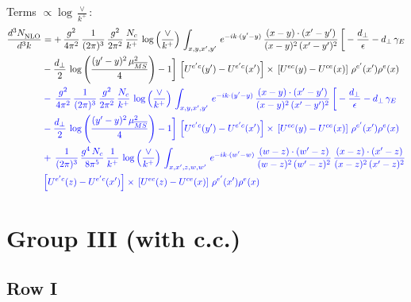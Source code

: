 \documentclass[10pt]{article}
\numberwithin{equation}{section}
\newcommand{\nc}{\color{blue}}
\begin{document}
\noindent Terms $\propto\log\frac{\vee}{k^+}$:
\begin{align}
    \frac{d^{3}N_{\rm NLO}^{\rm}}{d^{3}k}  & =    +\, \frac{g^{2}}{4\pi^{2}}\, \frac{1}{(2\pi)^{3}}\,\frac{g^{2}}{2\pi^{2}}\, \frac{N_{c}}{k^{+}}\,\log{\left(\frac{\vee}{k^{+}}\right)}\,\int_{x,y,x',y'}\,e^{-ik\cdot (y'-y)}\,\frac{(x-y)\cdot (x'-y')}{(x-y)^{2}\,(x'-y')^{2}}\,\bigg[-\frac{d_{\perp}}{\epsilon}-d_{\perp}\,\gamma_{E}\notag \\ & -\frac{d_{\perp}}{2}\,\log{\left(\frac{(y'-y)^{2}\,\mu^{2}_{\overline{MS}}}{4}\right)}-1\bigg]\,\left[U^{e'c}(y') - U^{e'c}(x')\right] \times\, \left[U^{ec}(y) - U^{ce}(x)\right]\, \rho^{e'}(x') \rho^{e}(x) \notag \\
& \nc  -\, \frac{g^{2}}{4\pi^{2}}\, \frac{1}{(2\pi)^{3}}\,\frac{g^{2}}{2\pi^{2}}\, \frac{N_{c}}{k^{+}}\,\log{\left(\frac{\vee}{k^{+}}\right)}\,\int_{x,y,x',y'}\,e^{-ik\cdot (y'-y)}\,\frac{(x-y)\cdot (x'-y')}{(x-y)^{2}\,(x'-y')^{2}}\,\bigg[-\frac{d_{\perp}}{\epsilon}-d_{\perp}\,\gamma_{E}\notag \\ & \nc  -\frac{d_{\perp}}{2}\,\log{\left(\frac{(y'-y)^{2}\,\mu^{2}_{\overline{MS}}}{4}\right)}-1\bigg]\,\left[U^{e'c}(y') - U^{e'c}(x')\right] \times\, \left[U^{ec}(y) - U^{ce}(x)\right]\, \rho^{e'}(x') \rho^{e}(x) \notag \\
& \nc  +\,\frac{1}{(2\pi)^{3}}\,\frac{g^{4}\,N_{c}}{8\pi^{5}}\,\frac{1}{k^{+}}\,\log{\left(\frac{\vee}{k^{+}}\right)}\,\int_{x,x',z,w,w'}\,e^{-ik\cdot (w'-w)}\,\frac{(w-z)\cdot(w'-z)}{(w-z)^{2}\,(w'-z)^{2}}\,\frac{(x-z)\cdot(x'-z)}{(x-z)^{2}\,(x'-z)^{2}}\notag \\ & \nc  \left[U^{e'c}(z) - U^{e'c}(x')\right] \times\, \left[U^{ec}(z) - U^{ce}(x)\right]\, \rho^{e'}(x') \rho^{e}(x) \label{eq:B:G2IV}
\end{align}

\section{Group III (with c.c.)}\label{sec:LLgIII}
\subsection{Row I}
\end{document}
